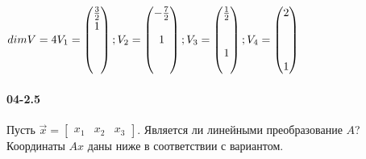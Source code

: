 \documentclass[12pt]{article}
\begin{document}
	\ensuremath{
		\\
		dim V = 4
		\\
		V_{1} = \begin{pmatrix}
			\frac{3}{2} \\
			1 \\
			\\
			\\
			\\
		\end{pmatrix}
		;
		V_{2} = \begin{pmatrix}
			-\frac{7}{2} \\
			\\
			1 \\
			\\
			\\
		\end{pmatrix}
		;
		V_{3} = \begin{pmatrix}
			\frac{1}{2} \\
			\\
			\\
			1\\
			\\
		\end{pmatrix}
		;
		V_{4} = \begin{pmatrix}
			2 \\
			\\
			\\
			\\
			1 \\
		\end{pmatrix}
	}	


	\clearpage
	\paragraph{04-2.5} Пусть \ensuremath{\vec{x} = \begin{bmatrix} x_{1} & x_{2} & x_{3} \end{bmatrix}}. Является ли линейными преобразование \ensuremath{A}? Координаты \ensuremath{A x} даны ниже в соответствии с вариантом.
\end{document}
